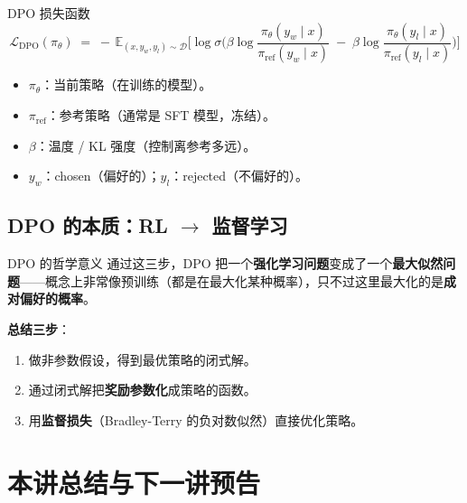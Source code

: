 \documentclass[a4paper]{article}
\begin{document}
\begin{importantbox}{DPO 损失函数}
\[
\mathcal{L}_{\mathrm{DPO}}(\pi_\theta)
\;=\; -\,\mathbb{E}_{(x,y_w,y_l)\sim\mathcal{D}}
\Bigg[\log\sigma\!\Bigg(
\beta\log\frac{\pi_\theta(y_w\mid x)}{\pi_{\mathrm{ref}}(y_w\mid x)}
\;-\;\beta\log\frac{\pi_\theta(y_l\mid x)}{\pi_{\mathrm{ref}}(y_l\mid x)}
\Bigg)\Bigg]
\]

\begin{itemize}
\item $\pi_\theta$：当前策略（在训练的模型）。
\item $\pi_{\mathrm{ref}}$：参考策略（通常是 SFT 模型，冻结）。
\item $\beta$：温度 / KL 强度（控制离参考多远）。
\item $y_w$：chosen（偏好的）；$y_l$：rejected（不偏好的）。
\end{itemize}
\end{importantbox}

\subsection{DPO 的本质：RL $\to$ 监督学习}

\begin{knowledgebox}{DPO 的哲学意义}
通过这三步，DPO 把一个\textbf{强化学习问题}变成了一个\textbf{最大似然问题}——概念上非常像预训练（都是在最大化某种概率），只不过这里最大化的是\textbf{成对偏好的概率}。

\textbf{总结三步}：
\begin{enumerate}
\item 做非参数假设，得到最优策略的闭式解。
\item 通过闭式解把\textbf{奖励参数化}成策略的函数。
\item 用\textbf{监督损失}（Bradley-Terry 的负对数似然）直接优化策略。
\end{enumerate}
\end{knowledgebox}

\section{本讲总结与下一讲预告}
\end{document}
